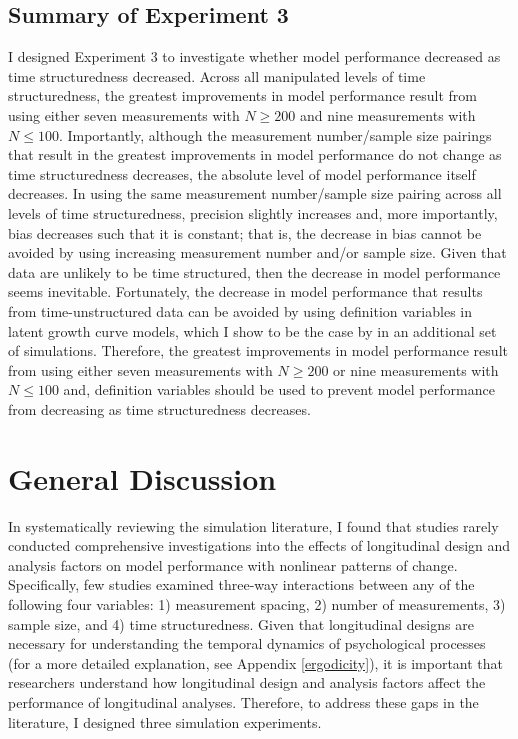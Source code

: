 \documentclass[
12pt, %
twoside,
english]{guelphthesis}
\begin{document}
\hypertarget{summary-of-experiment-3}{%
\section{Summary of Experiment 3}\label{summary-of-experiment-3}}

I designed Experiment 3 to investigate whether model performance decreased as time structuredness decreased. Across all manipulated levels of time structuredness, the greatest improvements in model performance result from using either seven measurements with \(N \ge 200\) and nine measurements with \(N \le 100\). Importantly, although the measurement number/sample size pairings that result in the greatest improvements in model performance do not change as time structuredness decreases, the absolute level of model performance itself decreases. In using the same measurement number/sample size pairing across all levels of time structuredness, precision slightly increases and, more importantly, bias decreases such that it is constant; that is, the decrease in bias cannot be avoided by using increasing measurement number and/or sample size. Given that data are unlikely to be time structured, then the decrease in model performance seems inevitable. Fortunately, the decrease in model performance that results from time-unstructured data can be avoided by using definition variables in latent growth curve models, which I show to be the case by in an additional set of simulations. Therefore, the greatest improvements in model performance result from using either seven measurements with \(N \ge 200\) or nine measurements with \(N \le 100\) and, definition variables should be used to prevent model performance from decreasing as time structuredness decreases.

\hypertarget{general-discussion}{%
\chapter{General Discussion}\label{general-discussion}}

In systematically reviewing the simulation literature, I found that studies rarely conducted comprehensive investigations into the effects of longitudinal design and analysis factors on model performance with nonlinear patterns of change. Specifically, few studies examined three-way interactions between any of the following four variables: 1) measurement spacing, 2) number of measurements, 3) sample size, and 4) time structuredness. Given that longitudinal designs are necessary for understanding the temporal dynamics of psychological processes (for a more detailed explanation, see Appendix \ref{ergodicity}), it is important that researchers understand how longitudinal design and analysis factors affect the performance of longitudinal analyses. Therefore, to address these gaps in the literature, I designed three simulation experiments.
\end{document}
